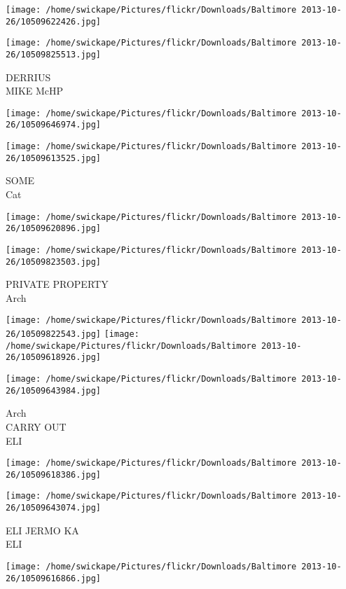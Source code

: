\documentclass[10pt,letterpaper]{article}
\begin{document}
\texttt{[image: /home/swickape/Pictures/flickr/Downloads/Baltimore 2013-10-26/10509622426.jpg]}

\vspace{0.25in}
\texttt{[image: /home/swickape/Pictures/flickr/Downloads/Baltimore 2013-10-26/10509825513.jpg]}

DERRIUS\\
MIKE McHP
\pagebreak

\texttt{[image: /home/swickape/Pictures/flickr/Downloads/Baltimore 2013-10-26/10509646974.jpg]}

\vspace{0.25in}
\texttt{[image: /home/swickape/Pictures/flickr/Downloads/Baltimore 2013-10-26/10509613525.jpg]}

SOME\\
Cat
\pagebreak

\texttt{[image: /home/swickape/Pictures/flickr/Downloads/Baltimore 2013-10-26/10509620896.jpg]}

\vspace{0.25in}
\texttt{[image: /home/swickape/Pictures/flickr/Downloads/Baltimore 2013-10-26/10509823503.jpg]}

PRIVATE PROPERTY\\
Arch
\pagebreak

\texttt{[image: /home/swickape/Pictures/flickr/Downloads/Baltimore 2013-10-26/10509822543.jpg]}
\texttt{[image: /home/swickape/Pictures/flickr/Downloads/Baltimore 2013-10-26/10509618926.jpg]}

\texttt{[image: /home/swickape/Pictures/flickr/Downloads/Baltimore 2013-10-26/10509643984.jpg]}

Arch\\
CARRY OUT\\
ELI
\pagebreak

\texttt{[image: /home/swickape/Pictures/flickr/Downloads/Baltimore 2013-10-26/10509618386.jpg]}

\vspace{0.25in}
\texttt{[image: /home/swickape/Pictures/flickr/Downloads/Baltimore 2013-10-26/10509643074.jpg]}

ELI JERMO KA\\
ELI
\pagebreak

\texttt{[image: /home/swickape/Pictures/flickr/Downloads/Baltimore 2013-10-26/10509616866.jpg]}
\end{document}
